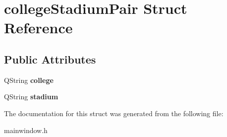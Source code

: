 \hypertarget{structcollege_stadium_pair}{}\section{college\+Stadium\+Pair Struct Reference}
\label{structcollege_stadium_pair}
\subsection*{Public Attributes}
\begin{DoxyCompactItemize}
\item 
\mbox{\label{structcollege_stadium_pair_a77ca4473825d5cd624b735a458b307bb}} 
Q\+String {\bfseries college}
\item 
\mbox{\label{structcollege_stadium_pair_a670f797a70b4d32b10c49414aada09ee}} 
Q\+String {\bfseries stadium}
\end{DoxyCompactItemize}


The documentation for this struct was generated from the following file\+:\begin{DoxyCompactItemize}
\item 
mainwindow.\+h\end{DoxyCompactItemize}
